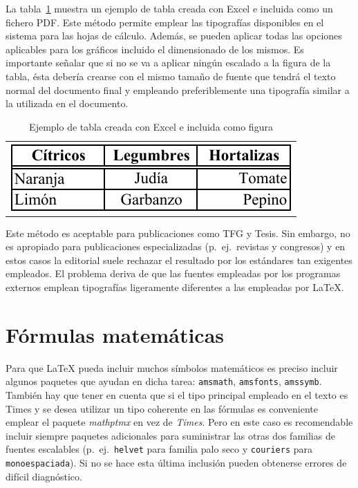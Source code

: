 \documentclass[ 		%
	11pt,				%
	a4paper,			%
	twoside,			%
	openright,			%
	final       		%
]{book}
\begin{document}
La tabla~\ref{tab:figura} muestra un ejemplo de tabla creada con \textsf{Excel} e incluida como un fichero \textsf{PDF}. Este método permite emplear las tipografías disponibles en el sistema para las hojas de cálculo. Además, se pueden aplicar todas las opciones aplicables para los gráficos incluido el dimensionado de los mismos. Es importante señalar que si no se va a aplicar ningún escalado a la figura de la tabla, ésta debería crearse con el mismo tamaño de fuente que tendrá el texto normal del documento final y empleando preferiblemente una tipografía similar a la utilizada en el documento.

\begin{table}[H]%
	\centering
	\caption[Tabla \textsf{Excel}]{Ejemplo de tabla creada con \textsf{Excel} e incluida como figura}
	\label{tab:figura}
	\begin{tabular}{c}
		\includegraphics{alimentos}
	\end{tabular}
\end{table}

Este método es aceptable para publicaciones como TFG y Tesis. Sin embargo, no es apropiado para publicaciones especializadas (p.~ej.\ revistas y congresos) y en estos casos la editorial suele rechazar el resultado por los estándares tan exigentes empleados. El problema deriva de que las fuentes empleadas por los programas externos emplean tipografías ligeramente diferentes a las empleadas por \LaTeX.




\chapter{Fórmulas matemáticas}
Para que \LaTeX{} pueda incluir muchos símbolos matemáticos es preciso incluir algunos paquetes que ayudan en dicha tarea: \texttt{amsmath}, \texttt{amsfonts}, \texttt{amssymb}. También hay que tener en cuenta que si el tipo principal empleado en el texto es Times y se desea utilizar un tipo coherente en las fórmulas es conveniente emplear el paquete \emph{mathptmx} en vez de \emph{Times}. Pero en este caso es recomendable incluir siempre paquetes adicionales para suministrar las otras dos familias de fuentes escalables (p.~ej.\ \texttt{helvet} para familia \textsf{palo seco} y \texttt{couriers} para \texttt{monoespaciada}). Si no se hace esta última inclusión pueden obtenerse errores de difícil diagnóstico.
\end{document}
